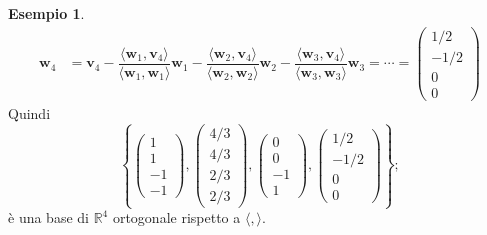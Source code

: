 \documentclass{article}
\theoremstyle{plain}
\theoremstyle{definition}
\newtheorem{exmp}{Esempio}[section]
\theoremstyle{remark}
\begin{document}
\begin{exmp}
\begin{align*}
    \mathbf{w}_4&=\mathbf{v}_4-\dfrac{\langle\mathbf{w}_1,\mathbf{v}_4\rangle}{\langle\mathbf{w}_1,\mathbf{w}_1\rangle}\mathbf{w}_1-\dfrac{\langle\mathbf{w}_2,\mathbf{v}_4\rangle}{\langle\mathbf{w}_2,\mathbf{w}_2\rangle}\mathbf{w}_2-\dfrac{\langle\mathbf{w}_3,\mathbf{v}_4\rangle}{\langle\mathbf{w}_3,\mathbf{w}_3\rangle}\mathbf{w}_3=\cdots=\begin{pmatrix}1/2\\-1/2\\0\\0\end{pmatrix}
\end{align*}
Quindi
\[\left\{\begin{pmatrix}1\\1\\-1\\-1\end{pmatrix},\begin{pmatrix}4/3\\4/3\\2/3\\2/3\end{pmatrix},\begin{pmatrix}0\\0\\-1\\1\end{pmatrix},\begin{pmatrix}1/2\\-1/2\\0\\0\end{pmatrix}\right\};\]
è una base di $\mathbb{R}^4$ ortogonale rispetto a $\langle,\rangle$.
\end{exmp}

\vspace{10pt}
\end{document}
